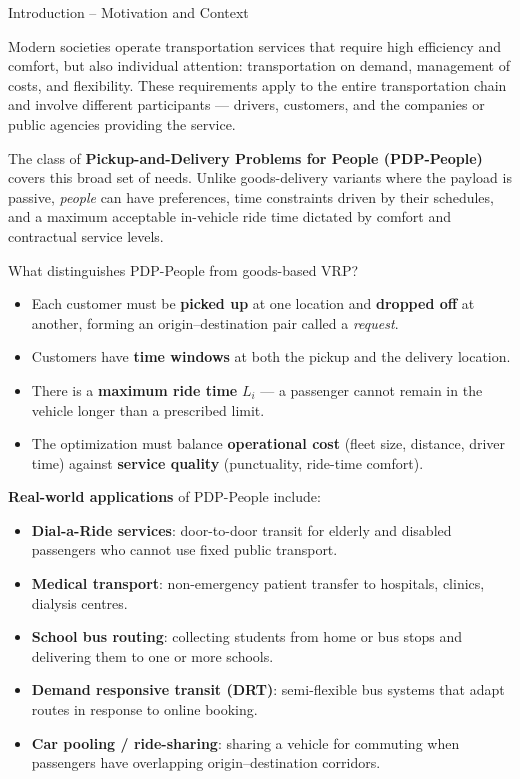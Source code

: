 \documentclass[aspectratio=169,10pt]{beamer}
\begin{document}
\begin{frame}[allowframebreaks]{Introduction – Motivation and Context}

  Modern societies operate transportation services that require high efficiency
  and comfort, but also individual attention: transportation on demand,
  management of costs, and flexibility.  These requirements apply to the entire
  transportation chain and involve different participants — drivers, customers,
  and the companies or public agencies providing the service.

  The class of \textbf{Pickup-and-Delivery Problems for People (PDP-People)}
  covers this broad set of needs.  Unlike goods-delivery variants where the
  payload is passive, \emph{people} can have preferences, time constraints
  driven by their schedules, and a maximum acceptable in-vehicle ride time
  dictated by comfort and contractual service levels.

  \begin{block}{What distinguishes PDP-People from goods-based VRP?}
    \begin{itemize}
      \item Each customer must be \textbf{picked up} at one location and
            \textbf{dropped off} at another, forming an origin–destination
            pair called a \emph{request}.
      \item Customers have \textbf{time windows} at both the pickup and the
            delivery location.
      \item There is a \textbf{maximum ride time} $L_i$ — a passenger cannot
            remain in the vehicle longer than a prescribed limit.
      \item The optimization must balance \textbf{operational cost} (fleet
            size, distance, driver time) against \textbf{service quality}
            (punctuality, ride-time comfort).
    \end{itemize}
  \end{block}

  \framebreak

  \textbf{Real-world applications} of PDP-People include:
  \begin{itemize}
    \item \textbf{Dial-a-Ride services}: door-to-door transit for elderly and
          disabled passengers who cannot use fixed public transport.
    \item \textbf{Medical transport}: non-emergency patient transfer to
          hospitals, clinics, dialysis centres.
    \item \textbf{School bus routing}: collecting students from home or bus
          stops and delivering them to one or more schools.
    \item \textbf{Demand responsive transit (DRT)}: semi-flexible bus systems
          that adapt routes in response to online booking.
    \item \textbf{Car pooling / ride-sharing}: sharing a vehicle for commuting
          when passengers have overlapping origin–destination corridors.
  \end{itemize}


\end{frame}
\end{document}
